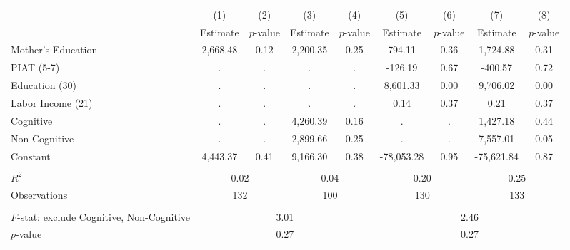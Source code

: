 \begin{tabular}{lcccccccc} \toprule
 & (1) & (2) & (3) & (4) & (5) & (6) & (7) & (8) \\
 & Estimate & $p$-value & Estimate & $p$-value  & Estimate & $p$-value  & Estimate & $p$-value  \\ \midrule 
Mother's Education &     2,668.48 &         0.12 &     2,200.35 &         0.25 &       794.11 &         0.36 &     1,724.88 &         0.31 \\  
PIAT (5-7) &            . &            . &            . &            . &      -126.19 &         0.67 &      -400.57 &         0.72 \\  
Education (30) &            . &            . &            . &            . &     8,601.33 &         0.00 &     9,706.02 &         0.00 \\  
Labor Income (21) &            . &            . &            . &            . &         0.14 &         0.37 &         0.21 &         0.37 \\  
Cognitive &            . &            . &     4,260.39 &         0.16 &            . &            . &     1,427.18 &         0.44 \\  
Non Cognitive &            . &            . &     2,899.66 &         0.25 &            . &            . &     7,557.01 &         0.05 \\  
Constant &     4,443.37 &         0.41 &     9,166.30 &         0.38 &   -78,053.28 &         0.95 &   -75,621.84 &         0.87 \\  \\ \midrule
$R^2$ &         \multicolumn{2}{c}{0.02} &          \multicolumn{2}{c}{0.04} &             \multicolumn{2}{c}{0.20} &                 \multicolumn{2}{c}{0.25}  \\  
Observations &        \multicolumn{2}{c}{132} &        \multicolumn{2}{c}{100} &     \multicolumn{2}{c}{130} &         \multicolumn{2}{c}{133}  \\  \\ \midrule
$F$-stat: exclude Cognitive, Non-Cognitive  &             \multicolumn{4}{c}{3.01} &               \multicolumn{4}{c}{2.46}  \\  
$p$-value &                \multicolumn{4}{c}{0.27} &               \multicolumn{4}{c}{0.27}   \\  \bottomrule \end{tabular}